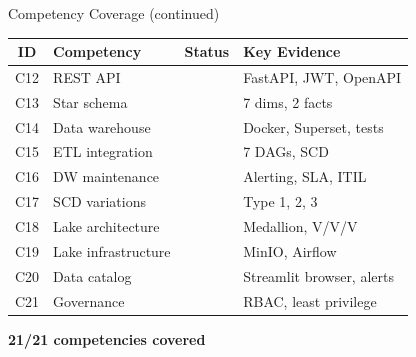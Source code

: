 \documentclass[aspectratio=169, 10pt]{beamer}
\newcommand{\fullcov}{\textcolor{ntgreen}{\faCheckCircle}}
\begin{document}
\begin{frame}{Competency Coverage (continued)}
\small
\begin{tabular}{clcl}
  \toprule
  \textbf{ID} & \textbf{Competency} & \textbf{Status} & \textbf{Key Evidence}\\
  \midrule
  C12 & REST API & \fullcov & FastAPI, JWT, OpenAPI\\
  C13 & Star schema & \fullcov & 7 dims, 2 facts\\
  C14 & Data warehouse & \fullcov & Docker, Superset, tests\\
  C15 & ETL integration & \fullcov & 7 DAGs, SCD\\
  C16 & DW maintenance & \fullcov & Alerting, SLA, ITIL\\
  C17 & SCD variations & \fullcov & Type 1, 2, 3\\
  C18 & Lake architecture & \fullcov & Medallion, V/V/V\\
  C19 & Lake infrastructure & \fullcov & MinIO, Airflow\\
  C20 & Data catalog & \fullcov & Streamlit browser, alerts\\
  C21 & Governance & \fullcov & RBAC, least privilege\\
  \bottomrule
\end{tabular}

\vspace{0.3cm}
\begin{center}
  {\Large\color{ntgreen}\faCheckCircle\quad \textbf{21/21 competencies covered}}
\end{center}

\end{frame}
\end{document}
